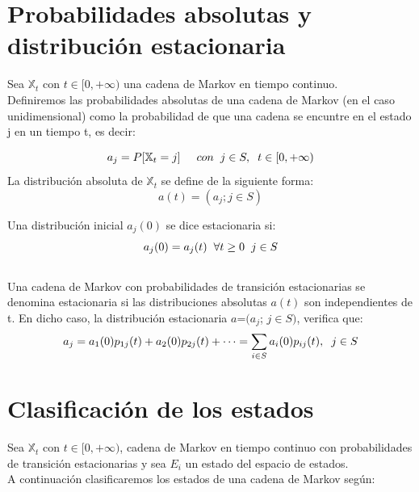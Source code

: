 \documentclass[12pt,a4paper]{article}
\begin{document}
\section{Probabilidades absolutas y distribución estacionaria}
	Sea $\mathbb{X}_{t}$ con $t\in[0,+\infty)$ una cadena de Markov en tiempo continuo.
	\\
	Definiremos las probabilidades absolutas de una cadena de Markov (en el caso unidimensional) como la probabilidad de que una cadena se encuntre en el estado j en un tiempo t, es decir:

\begin{equation*}	
	 a_{j}=P[\mathbb{X}_{t}=j] \hspace{0.5cm}  con \hspace{0.2cm} j\in{S}, \hspace{0.2cm}  t\in[0,+\infty)
 \end{equation*}
	La distribución absoluta de $\mathbb{X}_{t}$ se define de la siguiente forma:
			\begin{equation*}
			a(t)=(a_{j}; j\in{S})
		\end{equation*}
		
		Una distribución inicial $a_{j}(0)$ se dice estacionaria si: 
				\begin{equation*}
			a_{j}(0)=a_{j}(t) \hspace{0.2cm}  \forall t\geq 0 \hspace{0.2cm} j\in S
		\end{equation*}
	\\
			Una cadena de Markov con probabilidades de transición estacionarias se denomina estacionaria si las distribuciones absolutas
		$a(t)$ son independientes de t. En dicho caso, la distribución estacionaria $a$=$(a_{j}$; $j\in{S})$, verifica que:
		\begin{equation*}
		a_{j}=a_{1}(0)p_{1j}(t)+a_{2}(0)p_{2j}(t)+\cdots=\sum_{i\in{S}} a_{i}(0)p_{ij}(t), \hspace{0.2cm} j\in S
	\end{equation*}
\section{Clasificación de los estados}
	Sea $\mathbb{X}_{t}$ con $t\in[0,+\infty)$,  cadena de Markov en tiempo continuo con probabilidades de transición estacionarias y sea $E_{i}$ un estado del espacio de estados.
	\\
		A continuación clasificaremos los estados de una cadena de Markov según:
	
\end{document}
